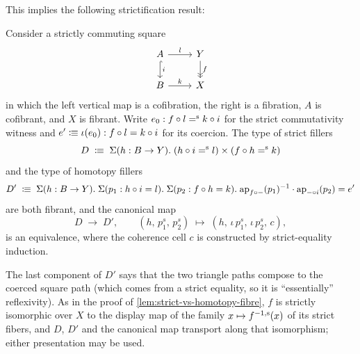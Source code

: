This implies the following strictification result:
\begin{lemma}\label{lem:correct-hom-fillers}
	Consider a strictly commuting square
	\[
		\begin{tikzcd}
			A  \ar[r,"l"] \ar[d,hookrightarrow,"i"]
			& Y \ar[d,->>,"f"] \\
			B \ar[r, "k"] & X
		\end{tikzcd}
	\]
	in which the left vertical map is a cofibration, the right is a fibration, $A$ is cofibrant, and $X$ is fibrant.
	Write $e_0 : f \circ l \mathrel{=^\textup{s}} k \circ i$ for the strict commutativity witness and $e' \mathrel{\vcentcolon\mspace{-1mu}\equiv} \iota(e_0) : f \circ l = k \circ i$ for its coercion.
	The type of strict fillers
	\[
		D \;\mathrel{\vcentcolon\mspace{-1mu}\equiv}\; \Sigma(h : B \to Y).\;(h \circ i \mathrel{=^\textup{s}} l) \times (f \circ h \mathrel{=^\textup{s}} k)
	\]
	and the type of homotopy fillers
	\[
		D' \;\mathrel{\vcentcolon\mspace{-1mu}\equiv}\; \Sigma(h : B \to Y).\;\Sigma(p_1 : h \circ i = l).\;\Sigma(p_2 : f \circ h = k).\;
		\mathrm{ap}_{f \circ -}(p_1)^{-1} \cdot \mathrm{ap}_{- \circ i}(p_2) = e'
	\]
	are both fibrant, and the canonical map
	\[
		D \;\longrightarrow\; D', \qquad
		(h,\,p_1^s,\,p_2^s) \;\mapsto\; (h,\,\iota\,p_1^s,\,\iota\,p_2^s,\,c),
	\]
	is an equivalence, where the coherence cell $c$ is constructed by strict-equality induction.
\end{lemma}
The last component of $D'$ says that the two triangle paths compose to the coerced square path (which comes from a strict equality, so it is ``essentially'' reflexivity).
As in the proof of \cref{lem:strict-vs-homotopy-fibre}, $f$ is strictly isomorphic over $X$ to the display map of the family $x\mapsto{f}^{-1, \textup{s}}(x)$ of its strict fibers, and $D$, $D'$ and the canonical map transport along that isomorphism; either presentation may be used.
